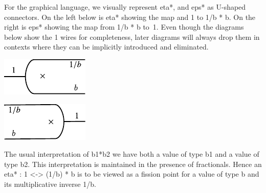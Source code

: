 \documentclass[preprint]{sigplanconf}
\begin{document}
\begin{multicols}{2}  

\end{multicols}

For the graphical language, we visually represent {{eta*}}, and
{{eps*}} as U-shaped connectors. On the left below is {{eta*}} showing
the map and {{1}} to {{1/b * b}}.  On the right is {{eps*}} showing
the map from {{1/b * b}} to~1. Even though the diagrams below show the
{{1}} wires for completeness, later diagrams will always drop them in
contexts where they can be implicitly introduced and eliminated.
\begin{multicols}{2}
\begin{center}
  \includegraphics{diagrams/eta_times.pdf}
\end{center}
  
\begin{center}
  \includegraphics{diagrams/eps_times.pdf}
\end{center}
\end{multicols}

The usual interpretation of {{b1*b2}} we have both a value of type
{{b1}} and a value of type {{b2}}. This interpretation is maintained
in the presence of fractionals. Hence an {{eta* : 1 <-> (1/b) * b}} is
to be viewed as a fission point for a value of type {{b}} and its
multiplicative inverse {{1/b}}. 

\begin{multicols}{2}
\begin{center}
\end{center}

\begin{center}
\end{center}  
\end{multicols}
\end{document}
